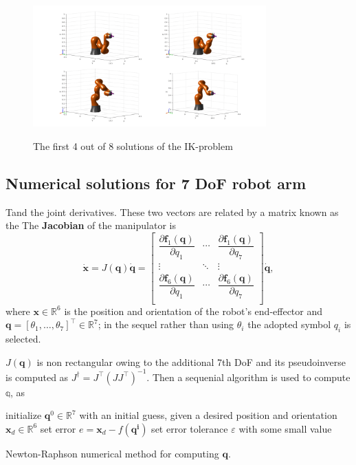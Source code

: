 \begin{center}
\begin{figure}[!htb]
\centering
\includegraphics[width=0.8\textwidth]{images/ik-4-solutions.png}\\
\caption{The first 4 out of 8 solutions of the IK-problem}
\end{figure}
\end{center}

\subsection{Numerical solutions for 7 DoF robot arm}

Tand the joint derivatives. These two vectors are related by a matrix known as the 
The \textbf{Jacobian} of the manipulator is 
\begin{equation}
\mathbf{\dot{x}} = J( \mathbf{q} ) \mathbf{\dot{q}} =
\begin{bmatrix}
\dfrac{\partial \mathbf{f}_1(\mathbf{q})}{\partial q_{1}} & \cdots & \dfrac{\partial \mathbf{f}_1(\mathbf{q})}{\partial q_{7}} \\
\vdots & \ddots & \vdots \\
\dfrac{\partial \mathbf{f}_6(\mathbf{q})}{\partial q_{1}} & \cdots & \dfrac{\partial \mathbf{f}_6(\mathbf{q})}{\partial q_{7}} \\
\end{bmatrix} 
\mathbf{\dot{q}},
\end{equation}
where $\mathbf{x} \in \mathbb{R}^6$ is the position and orientation of the robot's end-effector and $\mathbf{q} =\left[ \theta_1,\ldots,\theta_7\right]^{\top} \in \mathbb{R}^7$; in the sequel rather than using $\theta_i$ the adopted symbol $q_i$ is selected.

$J( \mathbf{q} )$ is non rectangular owing to the additional 7th DoF and its pseudoinverse is computed as $J^{\dagger} = J^\top ( J J^\top )^{-1}$. Then a sequenial algorithm is used to compute $\mathbb{q}$, as
\begin{algorithm}[H]
\SetAlgoLined
initialize $\mathbf{q}^0 \in \mathbb{R}^{7}$ with an initial guess, given a desired position and orientation $\mathbf{x}_d \in \mathbb{R}^{6}$\;
set error $e = \mathbf{x}_d - f(\mathbf{q^i})$\;
set error tolerance $ε$ with some small value\;
\caption{Newton-Raphson numerical method for computing $\mathbf{q}$.}
\end{algorithm}

